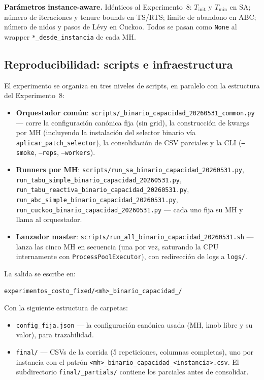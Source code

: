 \medskip
\noindent\textbf{Parámetros instance-aware.} Idénticos al Experimento~8:
$T_{\text{init}}$ y $T_{\min}$ en SA; número de iteraciones y tenure
bounds en TS/RTS; límite de abandono en ABC; número de nidos y pasos
de Lévy en Cuckoo. Todos se pasan como \texttt{None} al wrapper
\texttt{*\_desde\_instancia} de cada MH.

\subsection{Reproducibilidad: scripts e infraestructura}

El experimento se organiza en tres niveles de scripts, en paralelo con
la estructura del Experimento~8:

\begin{itemize}
\item \textbf{Orquestador común}:
  \texttt{scripts/\_binario\_capacidad\_20260531\_common.py} ---
  corre la configuración canónica fija (sin grid), la construcción de
  kwargs por MH (incluyendo la instalación del selector binario vía
  \texttt{aplicar\_patch\_selector}), la consolidación de CSV parciales
  y la CLI (\texttt{--smoke}, \texttt{--reps}, \texttt{--workers}).
\item \textbf{Runners por MH}:
  \texttt{scripts/run\_sa\_binario\_capacidad\_20260531.py},
  \texttt{run\_tabu\_simple\_binario\_capacidad\_20260531.py},
  \texttt{run\_tabu\_reactiva\_binario\_capacidad\_20260531.py},
  \texttt{run\_abc\_simple\_binario\_capacidad\_20260531.py},
  \texttt{run\_cuckoo\_binario\_capacidad\_20260531.py} ---
  cada uno fija su MH y llama al orquestador.
\item \textbf{Lanzador master}:
  \texttt{scripts/run\_all\_binario\_capacidad\_20260531.sh} ---
  lanza las cinco MH en secuencia (una por vez, saturando la CPU
  internamente con \texttt{ProcessPoolExecutor}), con redirección de
  logs a \texttt{logs/}.
\end{itemize}

La salida se escribe en:
\begin{center}
\texttt{experimentos\_costo\_fixed/<mh>\_binario\_capacidad\_<YYYYMMDD-HHMM>/}
\end{center}

Con la siguiente estructura de carpetas:

\begin{itemize}
\item \texttt{config\_fija.json} --- la configuración canónica usada
  (MH, knob libre y su valor), para trazabilidad.
\item \texttt{final/} --- CSVs de la corrida (5 repeticiones, columnas
  completas), uno por instancia con el patrón
  \texttt{<mh>\_binario\_capacidad\_<instancia>.csv}.
  El subdirectorio \texttt{final/\_partials/} contiene los parciales
  antes de consolidar.
\end{itemize}

